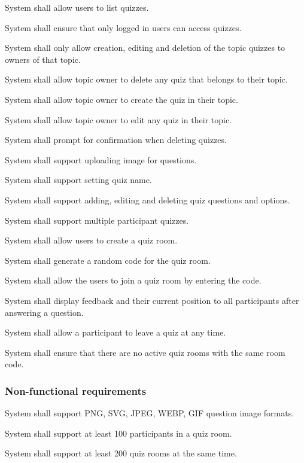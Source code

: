 \begin{frlist}
    \item System shall allow users to list quizzes.
    \item System shall ensure that only logged in users can access quizzes.
    \item System shall only allow creation, editing and deletion of the topic quizzes to owners of that topic.
    \item System shall allow topic owner to delete any quiz that belongs to their topic.
    \item System shall allow topic owner to create the quiz in their topic.
    \item System shall allow topic owner to edit any quiz in their topic.
    \item System shall prompt for confirmation when deleting quizzes.
    \item System shall support uploading image for questions.
    \item System shall support setting quiz name.
    \item System shall support adding, editing and deleting quiz questions and options.
    \item System shall support multiple participant quizzes.
    \item System shall allow users to create a quiz room.
    \item System shall generate a random code for the quiz room.
    \item System shall allow the users to join a quiz room by entering the code.
    \item System shall display feedback and their current position to all participants after answering a question.
    \item System shall allow a participant to leave a quiz at any time.
    \item System shall ensure that there are no active quiz rooms with the same room code.
\end{frlist}


\subsubsection{Non-functional requirements}


\begin{nfrlist}
    \item System shall support PNG, SVG, JPEG, WEBP, GIF question image formats.
    \item System shall support at least 100 participants in a quiz room.
    \item System shall support at least 200 quiz rooms at the same time.
\end{nfrlist}


